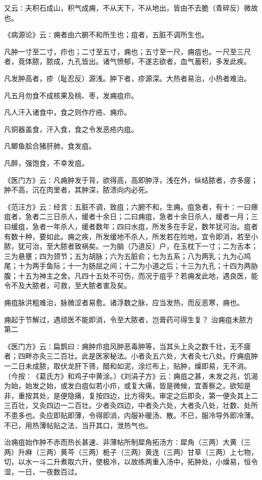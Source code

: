 \documentclass[a4paper,12pt,UTF8,twoside]{ctexbook}
\begin{document}
又云∶夫积石成山，积气成痈，不从天下，不从地出，皆由不去脆（青碎反）微故也。

《病源论》云∶痈者由六腑不和所生也；疽者，五脏不调所生也。

凡肿一寸至二寸，疖也；二寸至五寸，痈也；五寸至一尺，痈疽也。一尺至三尺者，竟体脓，脓成，九孔皆出。诸气愤郁，不遂志欲者，血气蓄积，多发此疾。

凡发肿高者，疹（耻忍反）源浅。肿下者，疹源深。大热者易治，小热者难治。

凡五月勿食不成核果及桃、枣，发痈疽疖。

凡人汗入诸食中，食之则作疔疮、痈疖。

凡铜器盖食，汗入食，食之令发恶疮内疽。

凡鲫鱼脍合猪肝肺，食发疽。

凡醉，强饱食，不幸发疽。

《医门方》云∶凡痈肿发于背，欲得高，高即肿浮，浅在外，纵结脓者，亦多瘥；肿不高，沉在肉里者，其肿深，脓溃向内必死。

《范汪方》云∶经言∶五脏不调，致疽；六腑不和，生痈。疽急者，有十∶一曰瘭疽者，急者二三日杀人，缓者十余日；二曰痈疽，急者十余日杀人，缓者一月；三曰缓疽，急者一年杀人，缓者数年；四曰水疽，所发多在手足，数年犹可治。疽者有数十种，要如此。痈之疾，所发缓地不杀人，所发若在险地，宜令即消，若至小脓，犹可治，至大脓者致祸矣。一为脑（乃道反）户，在玉枕下一寸；二为舌本；三为悬壅；四为颈节；五为胡脉；六为五脏俞；七为五系；八为两乳；九为心鸠尾；十为两手鱼际；十一为肠屈之间；十二为小道之后；十三为九孔；十四为两胁腹；十五为神主之舍。凡四十五处不可伤，而况于疽乎？若痈发此地，遇良医，能令不及大脓者，可救，至大脓者害及矣。

痈疽脉洪粗难治，脉微涩者易愈。诸浮数之脉，应当发热，而反恶寒，痈也。

痈起于节解过，遇顽医不能即消，令至大脓者，岂膏药可得生复？
治痈疽未脓方第二

《医门方》云∶扁鹊曰∶痈肿疖疽风肿恶毒肿等，当其头上灸之数千壮，无不瘥者；四畔亦灸三二百壮。此是医家秘法。小者灸五六处，大者灸七八处。疗痈疽肿一二日未成脓，取伏龙肝下筛，醋和如泥，涂烂布上，贴肿，燥即易，无不消。（今按∶《葛氏方》和鸡子中黄涂。）《刘涓子方》云∶痈疽之甚，未发之兆，饥渴为始，始发之始，或发白疽似若小疖，或复大痛，皆是微候，宜善察之。欲知是非，重按其处，是便隐痛，复按四边，比方得失。审定之后即灸，第一便灸其上二三百壮，又灸四边一二百壮。少者灸四边，中者灸六处，大者灸八处，壮数、处所不患多也。灸应即贴即薄，令得即消，内服补暖汤、散。不已，服冷导外即冷薄。不已，用热薄帖贴之法，当开其口，泄热气也。

治痈疽始作肿不赤而热长甚速、非薄帖所制犀角拓汤方∶犀角（三两）大黄（三两）升麻（三两）黄芩（三两）栀子（三两）黄连（三两）甘草（三两）上七物，切，以水一斗二升煮取六升，使极冷，以故练两重入汤中，拓肿处，小燥易，恒令湿，一日，一夜数百过。
\end{document}
